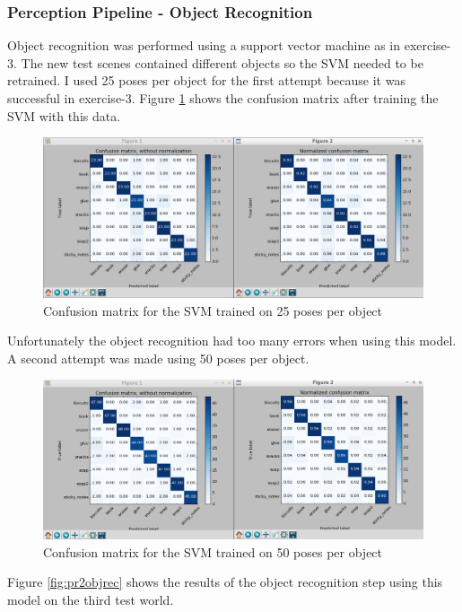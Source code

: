 \documentclass{article}
\begin{document}
\subsubsection{Perception Pipeline - Object Recognition}
Object recognition was performed using a support vector machine as in exercise-3. The new test scenes contained different objects so the SVM needed to be retrained. I used 25 poses per object for the first attempt because it was successful in exercise-3. Figure \ref{fig:pr2SVM25} shows the confusion matrix after training the SVM with this data.

\begin{figure}[H]
    \includegraphics[width=\linewidth]{pr2SVM25.png}
    \caption{Confusion matrix for the SVM trained on 25 poses per object}
    \label{fig:pr2SVM25}
\end{figure}

Unfortunately the object recognition had too many errors when using this model. A second attempt was made using 50 poses per object.

\begin{figure}[H]
    \includegraphics[width=\linewidth]{pr2SVM50.png}
    \caption{Confusion matrix for the SVM trained on 50 poses per object}
    \label{fig:pr2SVM50}
\end{figure}

Figure \ref{fig:pr2objrec} shows the results of the object recognition step using this model on the third test world.
\end{document}
